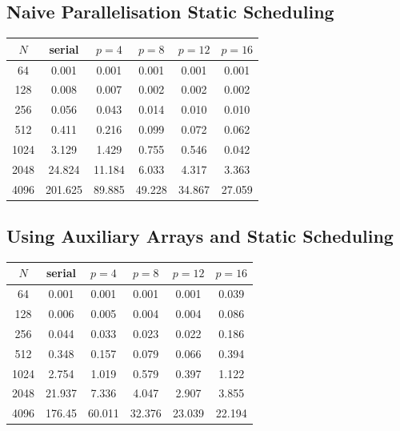 \documentclass{article}
\begin{document}
\subsection*{Naive Parallelisation Static Scheduling}
\begin{table}[!h]
\centering
\begin{tabular}{|c|c|c|c|c|c|} \hline
$N$ & serial & $p=4$ & $p=8$ & $p=12$ & $p=16$\\ \hline
64 & 0.001 & 0.001 & 0.001 & 0.001 & 0.001\\
128 & 0.008 & 0.007 & 0.002 & 0.002 & 0.002\\
256 & 0.056 & 0.043 & 0.014 & 0.010 & 0.010\\
512 & 0.411 & 0.216 & 0.099 & 0.072 & 0.062\\
1024 & 3.129 & 1.429 & 0.755 & 0.546 & 0.042\\
2048 & 24.824 & 11.184 & 6.033 & 4.317 & 3.363\\
4096 & 201.625 & 89.885 & 49.228 & 34.867 & 27.059\\ \hline
\end{tabular}
\end{table}

\subsection*{Using Auxiliary Arrays and Static Scheduling}
\begin{table}[!h]
\centering
\begin{tabular}{|c|c|c|c|c|c|} \hline
$N$ & serial & $p=4$ & $p=8$ & $p=12$ & $p=16$\\ \hline
64 & 0.001 & 0.001 & 0.001 & 0.001 & 0.039\\
128 & 0.006 & 0.005 & 0.004 & 0.004 & 0.086\\
256 & 0.044 & 0.033 & 0.023 & 0.022 & 0.186\\
512 & 0.348 & 0.157 & 0.079 & 0.066 & 0.394\\
1024 & 2.754 & 1.019 & 0.579 & 0.397 & 1.122\\
2048 & 21.937 & 7.336 & 4.047 & 2.907 & 3.855\\
4096 & 176.45 & 60.011 & 32.376 & 23.039 & 22.194\\ \hline
\end{tabular}
\end{table}
\end{document}
